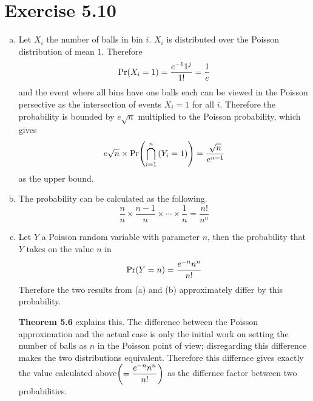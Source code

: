 \documentclass{article}
\begin{document}
\section*{Exercise 5.10}
\begin{enumerate}[(a)]
    \item Let $X_i$ the number of balls in bin $i$. $X_i$ is distributed over the Poisson distribution of mean $1$.
    Therefore 
    $$\mathrm{Pr}\qty(X_i = 1) = \frac{e^{-1}1^j}{1!} = \frac{1}{e}$$
    and the event where all bins have one balls each can be viewed in the Poisson persective as the intersection of events $X_i=1$ for all $i$.
    Therefore the probability is bounded by $e\sqrt{n}$ multiplied to the Poisson probability, which gives
    $$e\sqrt{n} \times \mathrm{Pr}\qty(\bigcap_{i=1}^{n}\qty(Y_i=1)) = \frac{\sqrt{n}}{e^{n-1}}$$
    as the upper bound.
    \item The probability can be calculated as the following.
    $$\frac{n}{n} \times \frac{n-1}{n} \times \cdots \times \frac{1}{n} = \frac{n!}{n^n}$$
    \item Let $Y$ a Poisson random variable with parameter $n$, then the probability that $Y$ takes on the value $n$ in
    $$\mathrm{Pr}\qty(Y = n) = \frac{e^{-n}n^n}{n!}$$
    Therefore the two results from (a) and (b) approximately differ by this probability.
    
    \vspace{2mm}
    \textbf{Theorem 5.6} explains this. 
    The difference between the Poisson approximation and the actual case is only the initial work on setting the number of balls as $n$ in the Poisson point of view; disregarding this difference makes the two distributions equivalent.
    Therefore this differnce gives exactly the value calculated above$\qty(=\dfrac{e^{-n}n^n}{n!})$ as the differnce factor between two probabilities.
\end{enumerate}
\end{document}

